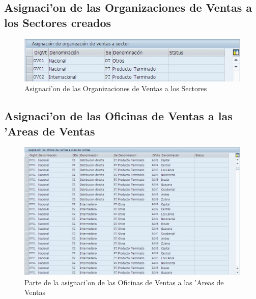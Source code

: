 \subsection*{Asignaci'on de las Organizaciones de Ventas a los Sectores creados}
\begin{figure}[H]
\centering
\includegraphics[scale=0.65,type=jpg,ext=.jpg,read=.jpg]{figures/OrgVentasSector}
\caption{Asignaci'on de las Organizaciones de Ventas a los Sectores}
\label{fig:asigna3}
\end{figure}

\subsection*{Asignaci'on de las Oficinas de Ventas a las 'Areas de Ventas}
\begin{figure}[H]
\centering
\includegraphics[scale=0.65,type=jpg,ext=.jpg,read=.jpg]{figures/OfVentaAreas}
\caption{Parte de la asignaci'on de las Oficinas de Ventas a las 'Areas de Ventas}
\label{fig:asigna4}
\end{figure}

